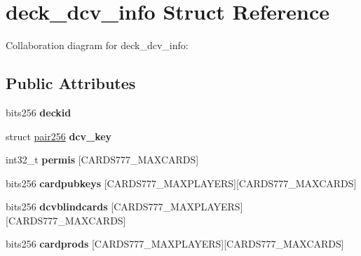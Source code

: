 \hypertarget{structdeck__dcv__info}{}\section{deck\+\_\+dcv\+\_\+info Struct Reference}
\label{structdeck__dcv__info}


Collaboration diagram for deck\+\_\+dcv\+\_\+info\+:
\subsection*{Public Attributes}
\begin{DoxyCompactItemize}
\item 
\mbox{\label{structdeck__dcv__info_afcae07e0ab2f88ef3e27e5d3c2e8dd51}} 
bits256 {\bfseries deckid}
\item 
\mbox{\label{structdeck__dcv__info_af771836c5b878645f37a534b4bdc4daa}} 
struct \hyperlink{structpair256}{pair256} {\bfseries dcv\+\_\+key}
\item 
\mbox{\label{structdeck__dcv__info_a25fd0412547703e73a77605912374b38}} 
int32\+\_\+t {\bfseries permis} \mbox{[}C\+A\+R\+D\+S777\+\_\+\+M\+A\+X\+C\+A\+R\+DS\mbox{]}
\item 
\mbox{\label{structdeck__dcv__info_ae031536026c1fa0fa5c9d2ee431f512d}} 
bits256 {\bfseries cardpubkeys} \mbox{[}C\+A\+R\+D\+S777\+\_\+\+M\+A\+X\+P\+L\+A\+Y\+E\+RS\mbox{]}\mbox{[}C\+A\+R\+D\+S777\+\_\+\+M\+A\+X\+C\+A\+R\+DS\mbox{]}
\item 
\mbox{\label{structdeck__dcv__info_a96eea74bbc4a46093273b82ac13dfcef}} 
bits256 {\bfseries dcvblindcards} \mbox{[}C\+A\+R\+D\+S777\+\_\+\+M\+A\+X\+P\+L\+A\+Y\+E\+RS\mbox{]}\mbox{[}C\+A\+R\+D\+S777\+\_\+\+M\+A\+X\+C\+A\+R\+DS\mbox{]}
\item 
\mbox{\label{structdeck__dcv__info_a25b24572c534cb608259e8f767d95469}} 
bits256 {\bfseries cardprods} \mbox{[}C\+A\+R\+D\+S777\+\_\+\+M\+A\+X\+P\+L\+A\+Y\+E\+RS\mbox{]}\mbox{[}C\+A\+R\+D\+S777\+\_\+\+M\+A\+X\+C\+A\+R\+DS\mbox{]}
\item 
\mbox{\label{structdeck__dcv__info_ab353e16283749de7b5ce105f864733e3}} 

\end{DoxyCompactItemize}
